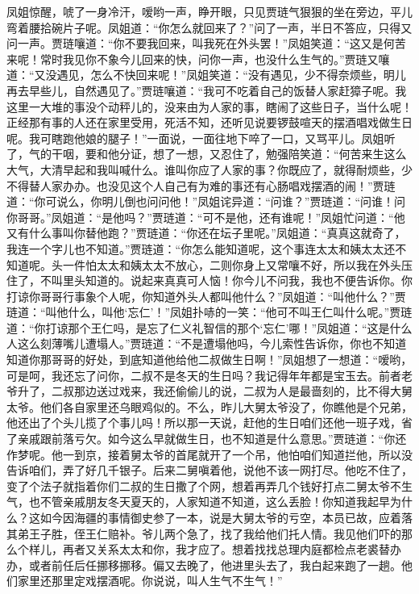 \begin{parag}
    凤姐惊醒，唬了一身冷汗，嗳哟一声，睁开眼，只见贾琏气狠狠的坐在旁边，平儿弯着腰拾碗片子呢。凤姐道：“你怎么就回来了？”问了一声，半日不答应，只得又问一声。贾琏嚷道：“你不要我回来，叫我死在外头罢！”凤姐笑道：“这又是何苦来呢！常时我见你不象今儿回来的快，问你一声，也没什么生气的。”贾琏又嚷道：“又没遇见，怎么不快回来呢！”凤姐笑道：“没有遇见，少不得奈烦些，明儿再去早些儿，自然遇见了。”贾琏嚷道：“我可不吃着自己的饭替人家赶獐子呢。我这里一大堆的事没个动秤儿的，没来由为人家的事，瞎闹了这些日子，当什么呢！正经那有事的人还在家里受用，死活不知，还听见说要锣鼓喧天的摆酒唱戏做生日呢。我可瞎跑他娘的腿子！”一面说，一面往地下啐了一口，又骂平儿。凤姐听了，气的干咽，要和他分证，想了一想，又忍住了，勉强陪笑道：“何苦来生这么大气，大清早起和我叫喊什么。谁叫你应了人家的事？你既应了，就得耐烦些，少不得替人家办办。也没见这个人自己有为难的事还有心肠唱戏摆酒的闹！”贾琏道：“你可说么，你明儿倒也问问他！”凤姐诧异道：“问谁？”贾琏道：“问谁！问你哥哥。”凤姐道：“是他吗？”贾琏道：“可不是他，还有谁呢！”凤姐忙问道：“他又有什么事叫你替他跑？”贾琏道：“你还在坛子里呢。”凤姐道：“真真这就奇了，我连一个字儿也不知道。”贾琏道：“你怎么能知道呢，这个事连太太和姨太太还不知道呢。头一件怕太太和姨太太不放心，二则你身上又常嚷不好，所以我在外头压住了，不叫里头知道的。说起来真真可人恼！你今儿不问我，我也不便告诉你。你打谅你哥哥行事象个人呢，你知道外头人都叫他什么？”凤姐道：“叫他什么？”贾琏道：“叫他什么，叫他‘忘仁’！”凤姐扑哧的一笑：“他可不叫王仁叫什么呢。”贾琏道：“你打谅那个王仁吗，是忘了仁义礼智信的那个‘忘仁’哪！”凤姐道：“这是什么人这么刻薄嘴儿遭塌人。”贾琏道：“不是遭塌他吗，今儿索性告诉你，你也不知道知道你那哥哥的好处，到底知道他给他二叔做生日啊！”凤姐想了一想道：“嗳哟，可是呵，我还忘了问你，二叔不是冬天的生日吗？我记得年年都是宝玉去。前者老爷升了，二叔那边送过戏来，我还偷偷儿的说，二叔为人是最啬刻的，比不得大舅太爷。他们各自家里还乌眼鸡似的。不么，昨儿大舅太爷没了，你瞧他是个兄弟，他还出了个头儿揽了个事儿吗！所以那一天说，赶他的生日咱们还他一班子戏，省了亲戚跟前落亏欠。如今这么早就做生日，也不知道是什么意思。”贾琏道：“你还作梦呢。他一到京，接着舅太爷的首尾就开了一个吊，他怕咱们知道拦他，所以没告诉咱们，弄了好几千银子。后来二舅嗔着他，说他不该一网打尽。他吃不住了，变了个法子就指着你们二叔的生日撒了个网，想着再弄几个钱好打点二舅太爷不生气，也不管亲戚朋友冬天夏天的，人家知道不知道，这么丢脸！你知道我起早为什么？这如今因海疆的事情御史参了一本，说是大舅太爷的亏空，本员已故，应着落其弟王子胜，侄王仁赔补。爷儿两个急了，找了我给他们托人情。我见他们吓的那么个样儿，再者又关系太太和你，我才应了。想着找找总理内庭都检点老裘替办办，或者前任后任挪移挪移。偏又去晚了，他进里头去了，我白起来跑了一趟。他们家里还那里定戏摆酒呢。你说说，叫人生气不生气！”
\end{parag}


